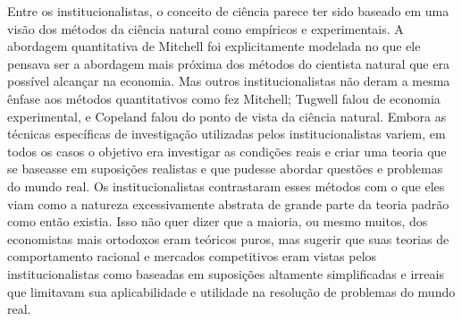 \documentclass[12pt]{article}
\begin{document}
Entre os institucionalistas, o conceito de ciência parece ter sido baseado em uma visão dos métodos da ciência natural como empíricos e experimentais. A abordagem quantitativa de Mitchell foi explicitamente modelada no que ele pensava ser a abordagem mais próxima dos métodos do cientista natural que era possível alcançar na economia. Mas outros institucionalistas não deram a mesma ênfase aos métodos quantitativos como fez Mitchell; Tugwell falou de economia experimental, e Copeland falou do ponto de vista da ciência natural. Embora as técnicas específicas de investigação utilizadas pelos institucionalistas variem, em todos os casos o objetivo era investigar as condições reais e criar uma teoria que se baseasse em suposições realistas e que pudesse abordar questões e problemas do mundo real. Os institucionalistas contrastaram esses métodos com o que eles viam como a natureza excessivamente abstrata de grande parte da teoria padrão como então existia. Isso não quer dizer que a maioria, ou mesmo muitos, dos economistas mais ortodoxos eram teóricos puros, mas sugerir que suas teorias de comportamento racional e mercados competitivos eram vistas pelos institucionalistas como baseadas em suposições altamente simplificadas e irreais que limitavam sua aplicabilidade e utilidade na resolução de problemas do mundo real.
\end{document}
